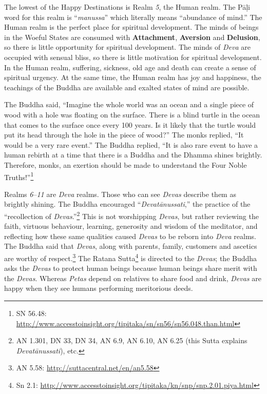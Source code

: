The lowest of the Happy Destinations is Realm \textit{5}, the Human realm. The Pāḷi word for this realm is “\textit{manussa}” which literally means “abundance of mind.” The Human realm is the perfect place for spiritual development. The minds of beings in the Woeful States are consumed with \textbf{Attachment}, \textbf{Aversion} and \textbf{Delusion}, so there is little opportunity for spiritual development. The minds of \textit{Deva} are occupied with sensual bliss, so there is little motivation for spiritual development. In the Human realm, suffering, sickness, old age and death can create a sense of spiritual urgency. At the same time, the Human realm has joy and happiness, the teachings of the Buddha are available and exalted states of mind are possible.

The Buddha said, “Imagine the whole world was an ocean and a single piece of wood with a hole was floating on the surface. There is a blind turtle in the ocean that comes to the surface once every 100 years. Is it likely that the turtle would put its head through the hole in the piece of wood?” The monks replied, “It would be a very rare event.” The Buddha replied, “It is also rare event to have a human rebirth at a time that there is a Buddha and the Dhamma shines brightly. Therefore, monks, an exertion should be made to understand the Four Noble Truths!”\footnote{SN 56.48: \url{http://www.accesstoinsight.org/tipitaka/sn/sn56/sn56.048.than.html}}

Realms \textit{6}--\textit{11} are \textit{Deva} realms. Those who can see \textit{Devas} describe them as brightly shining. The Buddha encouraged “\textit{Devatānussati},” the practice of the “recollection of \textit{Devas}.”\footnote{AN 1.301, DN 33, DN 34, AN 6.9, AN 6.10, AN 6.25 (this Sutta explains \textit{Devatānussati}), etc.} This is not worshipping \textit{Devas}, but rather reviewing the faith, virtuous behaviour, learning, generosity and wisdom of the meditator, and reflecting how these same qualities caused \textit{Devas} to be reborn into \textit{Deva} realms. The Buddha said that \textit{Devas}, along with parents, family, customers and ascetics are worthy of respect.\footnote{AN 5.58: \url{http://suttacentral.net/en/an5.58}} The Ratana Sutta\footnote{Sn 2.1: \url{http://www.accesstoinsight.org/tipitaka/kn/snp/snp.2.01.piya.html}} is directed to the \textit{Devas}; the Buddha asks the \textit{Devas} to protect human beings because human beings share merit with the \textit{Devas}. Whereas \textit{Petas} depend on relatives to share food and drink, \textit{Devas} are happy when they see humans performing meritorious deeds.

